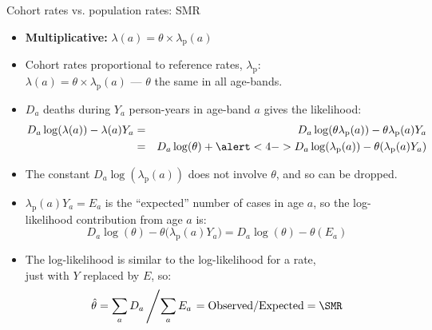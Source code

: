 \begin{frame}{Cohort rates vs. population rates: SMR}
  \begin{itemize}[<+->]
  \item \textbf{Multiplicative:} $\lambda(a) = \theta \times \lambda_\text{p}(a)$
  \item Cohort rates proportional to reference rates, $\lambda_\text{p}$:\\
    $\lambda(a) = \theta \times \lambda_\text{p}(a)$ --- $\theta$ the same in all
    age-bands.
  \item $D_a$ deaths during $Y_a$ person-years in age-band $a$ gives
    the likelihood:
 \begin{eqnarray*}
    D_a \log(\lambda(a)) - \lambda(a) Y_a
  & = & D_a \log(\theta\lambda_\text{p}(a)) - \theta\lambda_\text{p}(a) Y_a \\
  & = & D_a \log(\theta)+ \alert<4->{D_a \log(\lambda_\text{p}(a))} - \theta(\lambda_\text{p}(a) Y_a)
\end{eqnarray*}
\item The constant \alert<4->{$D_a \log(\lambda_\text{p}(a))$} does not involve $\theta$,
  and so can be dropped.
\end{itemize}
\end{frame}

\begin{frame}
  \begin{itemize}[<+->]
  \item $\lambda_\text{p}(a)Y_a = E_a$ is the ``expected'' number of cases in
    age $a$, so the log-likelihood contribution from age $a$ is:
\[
 D_a \log(\theta) - \theta\big(\lambda_\text{p}(a) Y_a\big) =
 D_a \log(\theta) - \theta(E_a)
\]
\item The log-likelihood is similar to the log-likelihood for a rate,\\
  just with $Y$ replaced by $E$, so:
\[
  \hat\theta = \sum_aD_a \left/ \sum_aE_a \right. =
  \mbox{Observed}/\mbox{Expected}
  = \SMR
\]
\end{itemize}
\end{frame}


